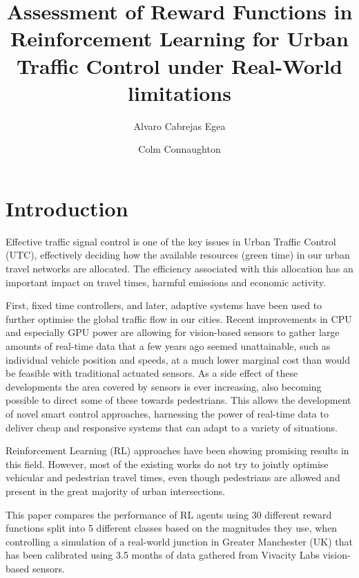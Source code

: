 \documentclass[sigconf,anonymous]{aamas}
\title{Assessment of Reward Functions in Reinforcement Learning for Urban Traffic Control under Real-World limitations}
\author{Alvaro Cabrejas Egea}
\affiliation{
  \department{MathSys CDT, University of Warwick}
  \institution{Vivacity Labs}
  \city{London, UK}}
\author{Colm Connaughton}
\affiliation{
  \department{Warwick Mathematics Institute}
  \institution{University of Warwick}
  \city{Coventry, UK}}
\begin{document}

\pagestyle{fancy}
\fancyhead{}


\maketitle 


\section{Introduction}
Effective traffic signal control is one of the key issues in Urban Traffic Control (UTC), effectively deciding how the available resources (green time) in our urban travel networks are allocated.
The efficiency associated with this allocation has an important impact on travel times, harmful emissions and economic activity.

First, fixed time controllers, and later, adaptive systems have been used to further optimise the global traffic flow in our cities.
Recent improvements in CPU and especially GPU power are allowing for vision-based sensors to gather large amounts of real-time data that a few years ago seemed unattainable, such as individual vehicle position and speeds, at a much lower marginal cost than would be feasible with traditional actuated sensors.
As a side effect of these developments the area covered by sensors is ever increasing, also becoming possible to direct some of these towards pedestrians.
This allows the development of novel smart control approaches, harnessing the power of real-time data to deliver cheap and responsive systems that can adapt to a variety of situations.

Reinforcement Learning (RL) approaches have been showing promising results in this field.
However, most of the existing works do not try to jointly optimise vehicular and pedestrian travel times, even though pedestrians are allowed and present in the great majority of urban intersections.

This paper compares the performance of RL agents using 30 different reward functions split into 5 different classes based on the magnitudes they use, when controlling a simulation of a real-world junction in Greater Manchester (UK) that has been calibrated using 3.5 months of data gathered from Vivacity Labs vision-based sensors.
\end{document}
